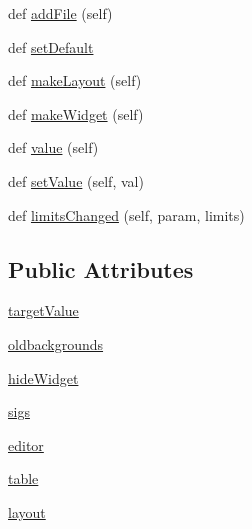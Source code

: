 \begin{DoxyCompactItemize}
def \hyperlink{classsoftware_1_1chipwhisperer_1_1common_1_1ui_1_1ParameterTypesCustom_1_1FilelistItem_a0b9479fbacb422dee4e45e742c1ee664}{add\+File} (self)
\item 
def \hyperlink{classsoftware_1_1chipwhisperer_1_1common_1_1ui_1_1ParameterTypesCustom_1_1FilelistItem_a34873216f7ac01e44383754ea1cb31ae}{set\+Default}
\item 
def \hyperlink{classsoftware_1_1chipwhisperer_1_1common_1_1ui_1_1ParameterTypesCustom_1_1FilelistItem_a8c0300f53f7fd633aba79b81e9ec7bce}{make\+Layout} (self)
\item 
def \hyperlink{classsoftware_1_1chipwhisperer_1_1common_1_1ui_1_1ParameterTypesCustom_1_1FilelistItem_a6463dd4e4f58d873f2e3dd4a0c09b034}{make\+Widget} (self)
\item 
def \hyperlink{classsoftware_1_1chipwhisperer_1_1common_1_1ui_1_1ParameterTypesCustom_1_1FilelistItem_ac423e3f2ba728bd94aba60065c997437}{value} (self)
\item 
def \hyperlink{classsoftware_1_1chipwhisperer_1_1common_1_1ui_1_1ParameterTypesCustom_1_1FilelistItem_ae2e409a6b741d5e8f81a1dae5261fa86}{set\+Value} (self, val)
\item 
def \hyperlink{classsoftware_1_1chipwhisperer_1_1common_1_1ui_1_1ParameterTypesCustom_1_1FilelistItem_ae8f48816532fe66ede909e0e034e37a2}{limits\+Changed} (self, param, limits)
\end{DoxyCompactItemize}
\subsection*{Public Attributes}
\begin{DoxyCompactItemize}
\item 
\hyperlink{classsoftware_1_1chipwhisperer_1_1common_1_1ui_1_1ParameterTypesCustom_1_1FilelistItem_aec76d239796dacf3642c3377caafa6f1}{target\+Value}
\item 
\hyperlink{classsoftware_1_1chipwhisperer_1_1common_1_1ui_1_1ParameterTypesCustom_1_1FilelistItem_ac906d242ed39ba1cd71cb1f4678bbf7e}{oldbackgrounds}
\item 
\hyperlink{classsoftware_1_1chipwhisperer_1_1common_1_1ui_1_1ParameterTypesCustom_1_1FilelistItem_afa977970d4f47b0c1c1f0300bf8bf72a}{hide\+Widget}
\item 
\hyperlink{classsoftware_1_1chipwhisperer_1_1common_1_1ui_1_1ParameterTypesCustom_1_1FilelistItem_ab079e63094f9ed2051d1b92145c11827}{sigs}
\item 
\hyperlink{classsoftware_1_1chipwhisperer_1_1common_1_1ui_1_1ParameterTypesCustom_1_1FilelistItem_a021a8119f92ba56f391510e99a5688f0}{editor}
\item 
\hyperlink{classsoftware_1_1chipwhisperer_1_1common_1_1ui_1_1ParameterTypesCustom_1_1FilelistItem_ab7a5ad52b06b011e6439238300ef1742}{table}
\item 
\hyperlink{classsoftware_1_1chipwhisperer_1_1common_1_1ui_1_1ParameterTypesCustom_1_1FilelistItem_a1e595b0ba895184c302a17bf903b68d1}{layout}
\end{DoxyCompactItemize}


